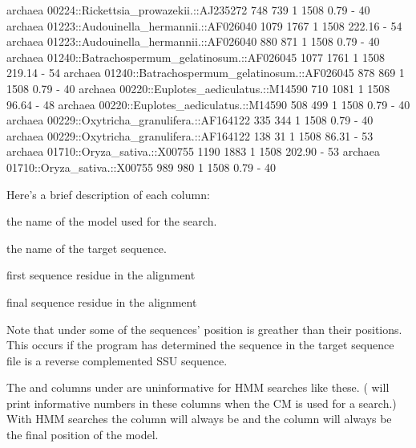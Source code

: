 \begin{sreoutputtiny}
  archaea     00224::Rickettsia_prowazekii.::AJ235272               748         739      1   1508      0.79         -   40
  archaea     01223::Audouinella_hermannii.::AF026040              1079        1767      1   1508    222.16         -   54
  archaea     01223::Audouinella_hermannii.::AF026040               880         871      1   1508      0.79         -   40
  archaea     01240::Batrachospermum_gelatinosum.::AF026045        1077        1761      1   1508    219.14         -   54
  archaea     01240::Batrachospermum_gelatinosum.::AF026045         878         869      1   1508      0.79         -   40
  archaea     00220::Euplotes_aediculatus.::M14590                  710        1081      1   1508     96.64         -   48
  archaea     00220::Euplotes_aediculatus.::M14590                  508         499      1   1508      0.79         -   40
  archaea     00229::Oxytricha_granulifera.::AF164122               335         344      1   1508      0.79         -   40
  archaea     00229::Oxytricha_granulifera.::AF164122               138          31      1   1508     86.31         -   53
  archaea     01710::Oryza_sativa.::X00755                         1190        1883      1   1508    202.90         -   53
  archaea     01710::Oryza_sativa.::X00755                          989         980      1   1508      0.79         -   40
\end{sreoutputtiny}

Here's a brief description of each column:

\begin{wideitem}
\item[\emprog{model name}] the name of the model used for the search.

\item[\emprog{target name}] the name of the target sequence.

\item[\emprog{start (target coord)}] first sequence residue in the alignment

\item[\emprog{end (target coord)}] final sequence residue in the alignment
\end{wideitem}

Note that under  some of the sequences'  position is
greather than their  positions. This occurs if the program
has determined the sequence in the target sequence file is a reverse
complemented SSU sequence. 

The  and  columns under  are
uninformative for HMM searches like these.
( will print informative numbers in
these columns when the CM is used for a search.) With HMM searches the
 column will always be  and the  column
will always be the final position of the model.

